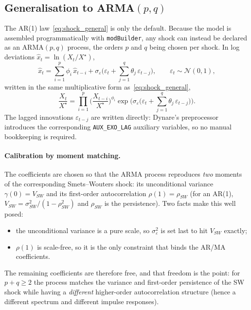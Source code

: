 \documentclass[11pt,a4paper]{article}
\begin{document}
\subsection{Generalisation to ARMA$(p,q)$}
\label{sec:arma}

The AR(1) law~\eqref{eq:shock_general} is only the default. Because the model
is assembled programmatically with \texttt{modBuilder}, any shock can instead be
declared as an ARMA$(p,q)$ process, the orders $p$ and $q$ being chosen per
shock. In log deviations $\hat x_t = \ln(X_t/X^{\star})$,
\begin{equation}\label{eq:arma}
  \hat x_t = \sum_{i=1}^{p}\phi_i\,\hat x_{t-i}
           + \sigma_\varepsilon\Big(\varepsilon_t
             + \sum_{j=1}^{q}\theta_j\,\varepsilon_{t-j}\Big),
  \qquad \varepsilon_t\sim\mathcal{N}(0,1),
\end{equation}
written in the same multiplicative form as~\eqref{eq:shock_general},
\[
  \frac{X_t}{X^{\star}}
  = \prod_{i=1}^{p}\Big(\frac{X_{t-i}}{X^{\star}}\Big)^{\!\phi_i}
    \exp\!\Big(\sigma_\varepsilon\big(\varepsilon_t
      + \textstyle\sum_{j=1}^{q}\theta_j\,\varepsilon_{t-j}\big)\Big).
\]
The lagged innovations $\varepsilon_{t-j}$ are written directly: Dynare's
preprocessor introduces the corresponding \texttt{AUX\_EXO\_LAG} auxiliary
variables, so no manual bookkeeping is required.

\paragraph{Calibration by moment matching.}
The coefficients are chosen so that the ARMA process reproduces \emph{two}
moments of the corresponding Smets--Wouters shock: its unconditional variance
$\gamma(0)=V_{SW}$ and its first-order autocorrelation $\rho(1)=\rho_{SW}$ (for
an AR(1), $V_{SW}=\sigma_{SW}^2/(1-\rho_{SW}^2)$ and $\rho_{SW}$ is the
persistence). Two facts make this well posed:
\begin{itemize}[nosep]
\item the unconditional variance is a pure scale, so $\sigma_\varepsilon^2$ is
  set last to hit $V_{SW}$ exactly;
\item $\rho(1)$ is scale-free, so it is the only constraint that binds the AR/MA
  coefficients.
\end{itemize}
The remaining coefficients are therefore free, and that freedom is the point:
for $p+q\ge 2$ the process matches the variance and first-order persistence of
the SW shock while having a \emph{different} higher-order autocorrelation
structure (hence a different spectrum and different impulse responses).
\end{document}
